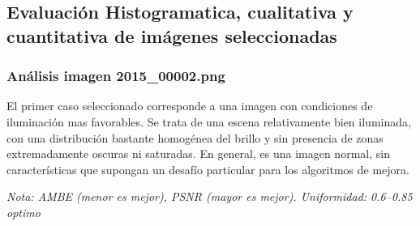 \documentclass[sigchi]{acmart}
\begin{document}
\subsection{Evaluación Histogramatica, cualitativa y cuantitativa de imágenes seleccionadas}

\subsubsection{\textbf{Análisis imagen 2015\_00002.png}}

El primer caso seleccionado corresponde a una imagen con condiciones de iluminación mas
favorables. Se trata de una escena relativamente bien iluminada, con una distribución bastante
homogénea del brillo y sin presencia de zonas extremadamente oscuras ni saturadas. En general,
es una imagen normal, sin características que supongan un desafío particular para los
algoritmos de mejora.

\begin{table}[H]
	\centering
	\caption{Métricas de calidad para la imagen 2015\_00002.png}
	\label{tab:metricas_2015_00002}

	\vspace{0.5em} %


	\vspace{0.5em} %
	\footnotesize%
	\textit{Nota: AMBE (menor es mejor), PSNR (mayor es mejor). Uniformidad: 0.6–0.85 optimo}
\end{table}
\end{document}
